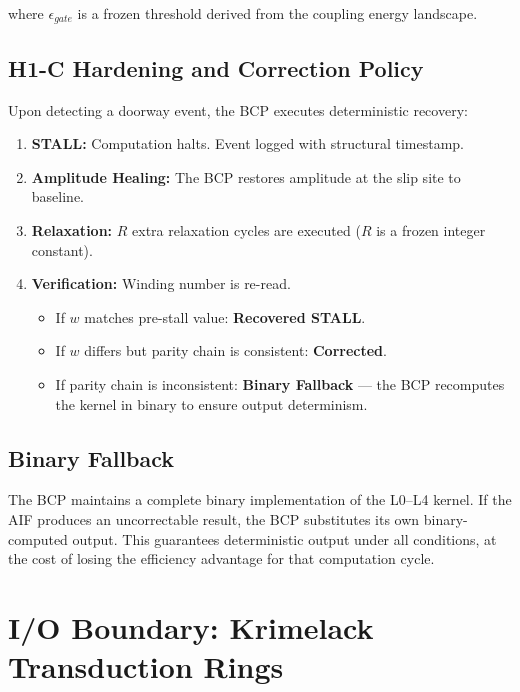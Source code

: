 \documentclass[11pt, a4paper]{article}
\begin{document}
where $\epsilon_{gate}$ is a frozen threshold derived from the coupling
energy landscape.

\subsection{H1-C Hardening and Correction Policy}

Upon detecting a doorway event, the BCP executes deterministic recovery:

\begin{enumerate}[label=\arabic*.]
  \item \textbf{STALL:} Computation halts. Event logged with structural
        timestamp.
  \item \textbf{Amplitude Healing:} The BCP restores amplitude at the slip
        site to baseline.
  \item \textbf{Relaxation:} $R$ extra relaxation cycles are executed
        ($R$ is a frozen integer constant).
  \item \textbf{Verification:} Winding number is re-read.
        \begin{itemize}[nosep]
          \item If $w$ matches pre-stall value: \textbf{Recovered STALL}.
          \item If $w$ differs but parity chain is consistent: \textbf{Corrected}.
          \item If parity chain is inconsistent: \textbf{Binary Fallback} ---
                the BCP recomputes the kernel in binary to ensure output
                determinism.
        \end{itemize}
\end{enumerate}

\subsection{Binary Fallback}

The BCP maintains a complete binary implementation of the L0--L4 kernel.
If the AIF produces an uncorrectable result, the BCP substitutes its own
binary-computed output. This guarantees deterministic output under all
conditions, at the cost of losing the efficiency advantage for that
computation cycle.

\section{I/O Boundary: Krimelack Transduction Rings}
\end{document}
